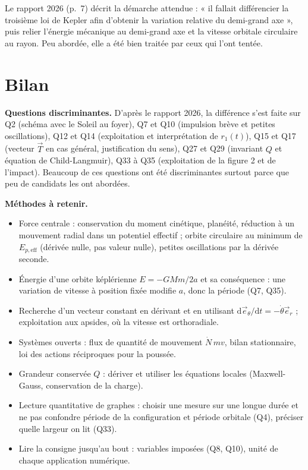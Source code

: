 \documentclass[11pt,a4paper]{article}
\providecommand{\tightlist}{\setlength{\itemsep}{0pt}\setlength{\parskip}{0pt}}
\begin{document}
\begin{jury}

Le rapport 2026 (p.~7) décrit la démarche attendue : « il fallait différencier la troisième loi de Kepler afin d'obtenir la variation relative du demi-grand axe », puis relier l'énergie mécanique au demi-grand axe et la vitesse orbitale circulaire au rayon. Peu abordée, elle a été bien traitée par ceux qui l'ont tentée.

\end{jury}

\hypertarget{bilan}{%
\section{Bilan}\label{bilan}}

\textbf{Questions discriminantes.} D'après le rapport 2026, la différence s'est faite sur Q2 (schéma avec le Soleil au foyer), Q7 et Q10 (impulsion brève et petites oscillations), Q12 et Q14 (exploitation et interprétation de \(r_1(t)\)), Q15 et Q17 (vecteur \(\vec T\) en cas général, justification du sens), Q27 et Q29 (invariant \(Q\) et équation de Child-Langmuir), Q33 à Q35 (exploitation de la figure 2 et de l'impact). Beaucoup de ces questions ont été discriminantes surtout parce que peu de candidats les ont abordées.

\textbf{Méthodes à retenir.}

\begin{itemize}
\tightlist
\item
  Force centrale : conservation du moment cinétique, planéité, réduction à un mouvement radial dans un potentiel effectif ; orbite circulaire au minimum de \(E_{p,\text{eff}}\) (dérivée nulle, pas valeur nulle), petites oscillations par la dérivée seconde.
\item
  Énergie d'une orbite képlérienne \(E=-GMm/2a\) et sa conséquence : une variation de vitesse à position fixée modifie \(a\), donc la période (Q7, Q35).
\item
  Recherche d'un vecteur constant en dérivant et en utilisant \(\mathrm d\vec e_\theta/\mathrm dt=-\dot\theta\vec e_r\) ; exploitation aux apsides, où la vitesse est orthoradiale.
\item
  Systèmes ouverts : flux de quantité de mouvement \(\dot N\,mv\), bilan stationnaire, loi des actions réciproques pour la poussée.
\item
  Grandeur conservée \(Q\) : dériver et utiliser les équations locales (Maxwell-Gauss, conservation de la charge).
\item
  Lecture quantitative de graphes : choisir une mesure sur une longue durée et ne pas confondre période de la configuration et période orbitale (Q4), préciser quelle largeur on lit (Q33).
\item
  Lire la consigne jusqu'au bout : variables imposées (Q8, Q10), unité de chaque application numérique.
\end{itemize}
\end{document}
